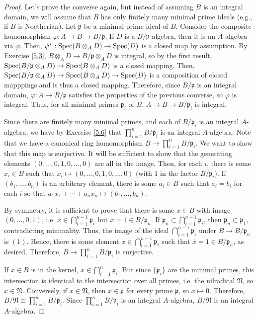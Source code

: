 \begin{proof}
Let's prove the converse again, but instead of assuming $B$ is an integral domain, we will assume that $B$ has only finitely many minimal prime ideals
(e.g., if $B$ is Noetherian). Let $\mathfrak{p}$ be a minimal prime ideal of $B$. Consider the composite homomorphism $\varphi : A \to B \to B/\mathfrak{p}$.
If $D$ is a $B/\mathfrak{p}$-algebra, then it is an $A$-algebra via $\varphi$. Then, $\psi^* : \operatorname{Spec}(B \otimes_A D) \to \operatorname{Spec}(D)$ is a closed map by assumption.
By Exercise \ref{5.3}, $B \otimes_A D \to B/\mathfrak{p} \otimes_A D$ is integral, so by the first result, $\operatorname{Spec}(B/\mathfrak{p} \otimes_A D) \to \operatorname{Spec}(B \otimes_A D)$
is a closed mapping. Then, $\operatorname{Spec}(B/\mathfrak{p} \otimes_A D) \to \operatorname{Spec}(B \otimes_A D) \to \operatorname{Spec}(D)$ is a composition of closed mapppings and is thus a closed
mapping. Therefore, since $B/\mathfrak{p}$ is an integral domain, $\varphi : A \to B/\mathfrak{p}$ satisfies the properties of the previous converse, so $\varphi$
is integral. Thus, for all minimal primes $\mathfrak{p}_i$ of $B$, $A \to B \to B/\mathfrak{p}_i$ is integral.

Since there are finitely many minimal primes, and each of $B/\mathfrak{p}_i$ is an integral $A$-algebra, we have by Exercise \ref{5.6} that $\prod_{i=1}^n B/\mathfrak{p}_i$
is an integral $A$-algebra. Note that we have a canonical ring homomorphism $B \to \prod_{i=1}^n B/\mathfrak{p}_i$. We want to show that this map is surjective.
It will be sufficient to show that the generating elements $(0,\ldots,0,1,0,\ldots,0)$ are all in the image. Then, for each $i$, there is some $x_i \in B$ such that
$x_i \mapsto (0,\ldots,0,1,0,\ldots,0)$ (with $1$ in the factor $B/\mathfrak{p}_i$). If $(b_1,\ldots,b_n)$ is an arbitrary element, there is some $a_i \in B$ such that $\overline{a_i} = b_i$
for each $i$ so that $a_1 x_1 + \cdots + a_n x_n \mapsto (b_1,\ldots,b_n)$.

By symmetry, it is sufficient to prove that there is some $x \in B$ with image $(0,\ldots,0,1)$, i.e. $x \in \bigcap_{i=1}^{n-1}\mathfrak{p}_i$ but $\overline{x} = 1 \in B/\mathfrak{p}_n$.
If $\mathfrak{p}_n \subset \bigcap_{i=1}^{n-1} \mathfrak{p}_i$, then $\mathfrak{p}_n \subset \mathfrak{p}_1$, contradicting minimality. Thus, the image of the ideal 
$\bigcap_{i=1}^{n-1} \mathfrak{p}_i$ under $B \to B/\mathfrak{p}_n$ is $(1)$. Hence, there is some element $x \in \bigcap_{i=1}^{n-1} \mathfrak{p}_i$ such that $\overline{x} = 1 \in B/\mathfrak{p}_n$,
as desired. Therefore, $B \to \prod_{i=1}^n B/\mathfrak{p}_i$ is surjective.

If $x \in B$ is in the kernel, $x \in \bigcap_{i=1}^n \mathfrak{p}_i$. But since $\{\mathfrak{p}_i\}$ are the minimal primes, this intersection is identical to the
intersection over all primes, i.e. the nilradical $\mathfrak{N}$, so $x \in \mathfrak{N}$. Conversely, if $x \in \mathfrak{N}$, then $x \in \mathfrak{p}$ for every prime
$\mathfrak{p}$, so $x \mapsto 0$. Therefore, $B/\mathfrak{N} \cong \prod_{i=1}^n B/\mathfrak{p}_i$. Since $\prod_{i=1}^n B/\mathfrak{p}_i$ is an
integral $A$-algebra, $B/\mathfrak{N}$ is an integral $A$-algebra. 


\end{proof}
